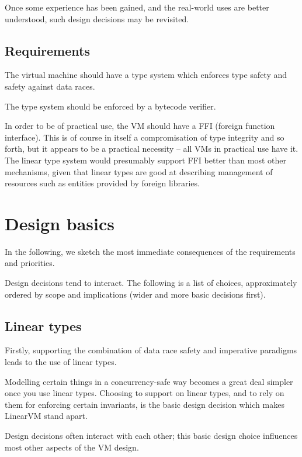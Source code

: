 \documentclass[a4paper]{book}
\begin{document}
Once some experience has been gained, and the real-world uses are
better understood, such design decisions may be revisited.


\section{Requirements}
The virtual machine should have a type system which
enforces type safety and safety against data races.

The type system should be enforced by a bytecode verifier.

In order to be of practical use, the VM should have a FFI (foreign
function interface).  This is of course in itself a compromisation of
type integrity and so forth, but it appears to be a practical necessity
-- all VMs
in practical use have it.  The linear type system would presumably
support FFI better than most other mechanisms, given that linear types are good at
describing management of resources such as entities provided by
foreign libraries.

\chapter{Design basics}

In the following, we sketch the most immediate consequences of the
requirements and priorities.

Design decisions tend to interact.
The following is a list of choices, approximately ordered by scope and
implications (wider and more basic decisions first).

\section{Linear types}
Firstly, supporting the combination of data race safety and imperative
paradigms leads to the use of linear types.

Modelling certain things in a concurrency-safe way becomes a great deal simpler
once you use linear types.
Choosing to support on linear types, and to rely on them for enforcing
certain invariants, is the basic design decision which makes LinearVM
stand apart.

Design decisions often interact with each other; this basic design choice
influences most other aspects of the VM design.
\end{document}
